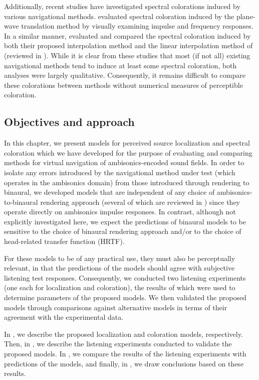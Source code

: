 Additionally, recent studies have investigated spectral colorations induced by various navigational methods.
\citet{HahnSpors2015b} evaluated spectral coloration induced by the plane-wave translation method \citep{SchultzSpors2013} by visually examining impulse and frequency responses.
In a similar manner, \citet{TylkaChoueiri2016} evaluated and compared the spectral coloration induced by both their proposed interpolation method and the linear interpolation method of \citet{Southern2009} (reviewed in ).
While it is clear from these studies that most (if not all) existing navigational methods tend to induce at least some spectral coloration, both analyses were largely qualitative.
Consequently, it remains difficult to compare these colorations between methods without numerical measures of perceptible coloration.

\subsection{Objectives and approach}
In this chapter, we present models for perceived source localization and spectral coloration which we have developed for the purpose of evaluating and comparing methods for virtual navigation of ambisonics-encoded sound fields.
In order to isolate any errors introduced by the navigational method under test (which operates in the ambisonics domain) from those introduced through rendering to binaural, we developed models that are independent of any choice of ambisonics-to-binaural rendering approach (several of which are reviewed in ) since they operate directly on ambisonics impulse responses.
In contrast, although not explicitly investigated here, we expect the predictions of binaural models to be sensitive to the choice of binaural rendering approach and/or to the choice of head-related transfer function (HRTF).

For these models to be of any practical use, they must also be perceptually relevant, in that the predictions of the models should agree with subjective listening test responses.
Consequently, we conducted two listening experiments (one each for localization and coloration), the results of which were used to determine parameters of the proposed models.
We then validated the proposed models through comparisons against alternative models in terms of their agreement with the experimental data.

In , we describe the proposed localization and coloration models, respectively.
Then, in , we describe the listening experiments conducted to validate the proposed models.
In , we compare the results of the listening experiments with predictions of the models, and finally, in , we draw conclusions based on these results.
